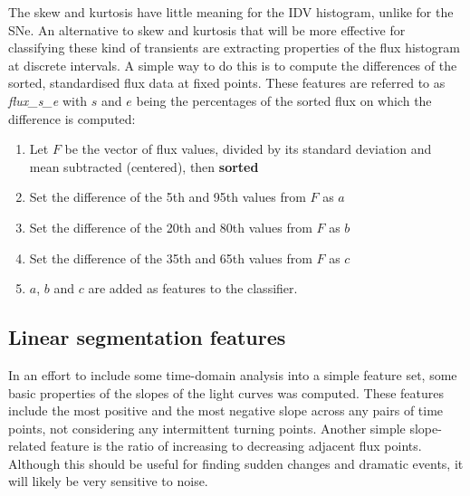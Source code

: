 	The skew and kurtosis have little meaning for the IDV histogram, unlike for the SNe. An alternative to skew and kurtosis that will be more effective for classifying these kind of transients are extracting properties of the flux histogram at discrete intervals. A simple way to do this is to compute the differences of the sorted, standardised flux data at fixed points. These features are referred to as \emph{flux\_s\_e} with $s$ and $e$ being the percentages of the sorted flux on which the difference is computed:
	
	\begin{enumerate}
		\item Let $F$ be the vector of flux values, divided by its standard deviation and mean subtracted (centered), then \textbf{sorted}
		\item Set the difference of the 5th and 95th values from $F$ as $a$
		\item Set the difference of the 20th and 80th values from $F$ as $b$
		\item Set the difference of the 35th and 65th values from $F$ as $c$
		\item $a$, $b$ and $c$ are added as features to the classifier.
	\end{enumerate}


	
	\subsection{Linear segmentation features}
	In an effort to include some time-domain analysis into a simple feature set, some basic properties of the slopes of the light curves was computed. These features include the most positive and the most negative slope across any pairs of time points, not considering any intermittent turning points. Another simple slope-related feature is the ratio of increasing to decreasing adjacent flux points. Although this should be useful for finding sudden changes and dramatic events, it will likely be very sensitive to noise.
	
